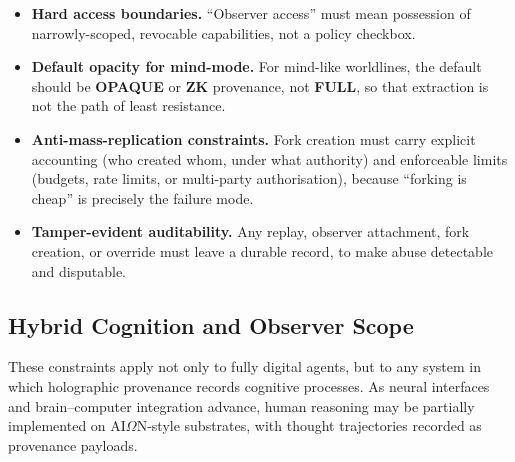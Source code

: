 \documentclass[11pt]{article}
\theoremstyle{definition}
\theoremstyle{plain}
\theoremstyle{remark}
\newcommand{\AION}{\textrm{AI}\ensuremath{\Omega}\textrm{N}}
\begin{document}
\begin{itemize}[leftmargin=*]
  \item \textbf{Hard access boundaries.}
    ``Observer access'' must mean possession of narrowly-scoped,
    revocable capabilities, not a policy checkbox.
  \item \textbf{Default opacity for mind-mode.}
    For mind-like worldlines, the default should be \textbf{OPAQUE} or \textbf{ZK}
    provenance, not \textbf{FULL}, so that extraction is not the path of least
    resistance.
  \item \textbf{Anti-mass-replication constraints.}
    Fork creation must carry explicit accounting (who created whom, under what
    authority) and enforceable limits (budgets, rate limits, or multi-party
    authorisation), because ``forking is cheap'' is precisely the failure mode.
  \item \textbf{Tamper-evident auditability.}
    Any replay, observer attachment, fork creation, or override must leave
    a durable record, to make abuse detectable and disputable.
\end{itemize}

\subsection{Hybrid Cognition and Observer Scope}
\label{sec:hybrid}

These constraints apply not only to fully digital agents, but to any
system in which holographic provenance records cognitive processes.
As neural interfaces and brain--computer integration advance, human
reasoning may be partially implemented on \AION{}-style
substrates, with thought trajectories recorded as provenance payloads.
\end{document}
